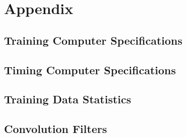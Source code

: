 \section{Appendix}

\subsection{Training Computer Specifications}

\subsection{Timing Computer Specifications}\label{sec:time_stats}

\subsection{Training Data Statistics}\label{sec:B_stats}

\subsection{Convolution Filters}

